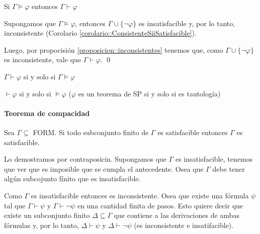 \begin{teorema}
	Si $\Gamma\vDash\varphi$ entonces $\Gamma\vdash\varphi$
\end{teorema}

\begin{demo}
	Supongamos que $\Gamma\vDash\varphi$, entonces $\Gamma\cup\{\lnot\varphi\}$ es insatisfacible y, por lo tanto, inconsistente (Corolario \ref{corolario::ConsistenteSiiSatisfacible}).
	
	Luego, por propocisión \ref{proposicion::inconsistentes} tenemos que, como $\Gamma\cup\{\lnot\varphi\}$ es inconsistente, vale que $\Gamma\vdash\varphi$. \qed
\end{demo}

\begin{corolario}
	$\Gamma\vdash\varphi$ si y solo si $\Gamma\vDash\varphi$
\end{corolario}

\begin{corolario}
	$\vdash\varphi$ si y solo si $\vDash\varphi$  ($\varphi$ es un teorema de SP si y solo si es tautología)
\end{corolario}

\paragraph{Teorema de compacidad}
\begin{teorema}
	Sea $\Gamma\subseteq$ FORM. Si todo subconjunto finito de $\Gamma$ es satisfacible entonces $\Gamma$ es satisfacible.
\end{teorema}

\begin{demo}
	Lo demostramos por contraposicin. Supongamos que $\Gamma$ es insatisfacible, tenemos que ver que es imposible que se cumpla el antecedente. Osea que $\Gamma$ debe tener algún subcojunto fínito que es insatisfacible.
	\end{demo}\begin{demoPart}
	Como $\Gamma$ es insatisfacible entonces es inconsistente. Osea que existe una fórmula $\psi$ tal que $\Gamma\vdash\psi$ y $\Gamma\vdash\lnot\psi$ en una cantidad finita de pasos. Esto quiere decir que existe un subconjunto finito $\Delta\subseteq\Gamma$ que contiene a las derivaciones de ambas fórmulas y, por lo tanto, $\Delta\vdash\psi$ y $\Delta\vdash\lnot\psi$ (es inconsistente e insatifacible).
\end{demoPart}
